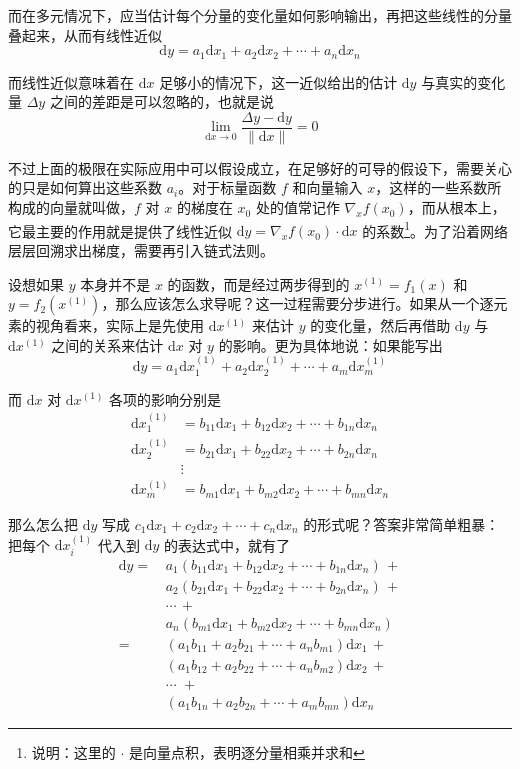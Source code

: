而在多元情况下，应当估计每个分量的变化量如何影响输出，再把这些线性的分量叠起来，从而有线性近似
\[
    \mathrm{d}y = a_1 \mathrm{d}x_1 + a_2 \mathrm{d}x_2 + \cdots + a_n \mathrm{d}x_n
\]

而线性近似意味着在 $\mathrm{d}x$ 足够小的情况下，这一近似给出的估计 $\mathrm{d}y$ 与真实的变化量 $\Delta y$ 之间的差距是可以忽略的，也就是说
\[
    \lim_{\mathrm{d}x\to 0} \frac{\Delta y - \mathrm{d}y}{\|\mathrm{d}x\|} = 0
\]

不过上面的极限在实际应用中可以假设成立，在足够好的可导的假设下，需要关心的只是如何算出这些系数 $a_i$。对于标量函数 $f$ 和向量输入 $x$，这样的一些系数所构成的向量就叫做，$f$ 对 $x$ 的梯度在 $x_0$ 处的值常记作 $\nabla_x f(x_0)$，而从根本上，它最主要的作用就是提供了线性近似 $\mathrm{d}y = \nabla_x f(x_0) \cdot \mathrm{d}x$ 的系数\footnote{说明：这里的 $\cdot$ 是向量点积，表明逐分量相乘并求和}。为了沿着网络层层回溯求出梯度，需要再引入链式法则。

设想如果 $y$ 本身并不是 $x$ 的函数，而是经过两步得到的 $x^{(1)} = f_1(x)$ 和 $y = f_2(x^{(1)})$，那么应该怎么求导呢？这一过程需要分步进行。如果从一个逐元素的视角看来，实际上是先使用 $\mathrm{d}x^{(1)}$ 来估计 $y$ 的变化量，然后再借助 $\mathrm{d}y$ 与 $\mathrm{d}x^{(1)}$ 之间的关系来估计 $\mathrm{d}x$ 对 $y$ 的影响。更为具体地说：如果能写出
\[
    \mathrm{d}y = a_1 \mathrm{d}x^{(1)}_1 + a_2 \mathrm{d}x^{(1)}_2 + \cdots + a_m \mathrm{d}x^{(1)}_m
\]

而 $\mathrm{d}x$ 对 $\mathrm{d}x^{(1)}$ 各项的影响分别是
\[
\begin{aligned}
    \mathrm{d}x^{(1)}_1 &= b_{11} \mathrm{d}x_1 + b_{12} \mathrm{d}x_2 + \cdots + b_{1n} \mathrm{d}x_n \\
    \mathrm{d}x^{(1)}_2 &= b_{21} \mathrm{d}x_1 + b_{22} \mathrm{d}x_2 + \cdots + b_{2n} \mathrm{d}x_n \\
    &\vdots \\
    \mathrm{d}x^{(1)}_m &= b_{m1} \mathrm{d}x_1 + b_{m2} \mathrm{d}x_2 + \cdots + b_{mn} \mathrm{d}x_n
\end{aligned}
\]

那么怎么把 $\mathrm{d}y$ 写成 $c_1 \mathrm{d}x_1 + c_2 \mathrm{d}x_2 + \cdots + c_n \mathrm{d}x_n$ 的形式呢？答案非常简单粗暴：把每个 $\mathrm{d}x^{(1)}_i$ 代入到 $\mathrm{d}y$ 的表达式中，就有了
\[
\begin{aligned}
    \mathrm{d}y =\, & a_1 (b_{11} \mathrm{d}x_1 + b_{12} \mathrm{d}x_2 + \cdots + b_{1n} \mathrm{d}x_n) \, + \\
    & a_2 (b_{21} \mathrm{d}x_1 + b_{22} \mathrm{d}x_2 + \cdots + b_{2n} \mathrm{d}x_n) \, + \\
    & \cdots \, +\\
    & a_n (b_{m1} \mathrm{d}x_1 + b_{m2} \mathrm{d}x_2 + \cdots + b_{mn} \mathrm{d}x_n)\\
    =\, & (a_1 b_{11} + a_2 b_{21} + \cdots + a_n b_{m1}) \mathrm{d}x_1 \,+ \\
    & (a_1 b_{12} + a_2 b_{22} + \cdots + a_n b_{m2}) \mathrm{d}x_2 \,+ \\
    & \cdots \, \,+\\
    & (a_1 b_{1n} + a_2 b_{2n} + \cdots + a_m b_{mn}) \mathrm{d}x_n
\end{aligned}
\]


